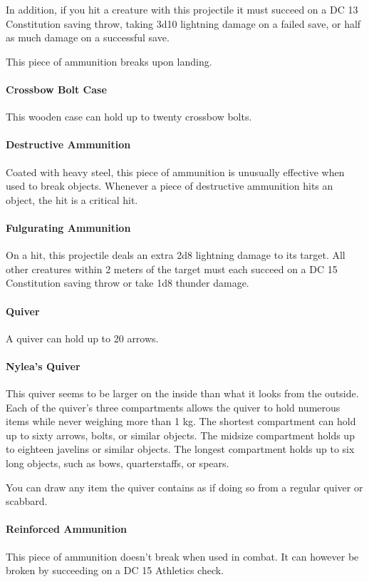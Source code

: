     In addition, if you hit a creature with this projectile it must succeed on a DC 13 Constitution saving throw, taking 3d10 lightning damage on a failed save, or half as much damage on a successful save.

    This piece of ammunition breaks upon landing.
\paragraph{Crossbow Bolt Case}
    This wooden case can hold up to twenty crossbow bolts.
\paragraph{Destructive Ammunition}
    Coated with heavy steel, this piece of ammunition is unusually effective when used to break objects.
    Whenever a piece of destructive ammunition hits an object, the hit is a critical hit.
\paragraph{Fulgurating Ammunition}
    On a hit, this projectile deals an extra 2d8 lightning damage to its target.
    All other creatures within 2 meters of the target must each succeed on a DC 15 Constitution saving throw or take 1d8 thunder damage.
\paragraph{Quiver}
    A quiver can hold up to 20 arrows.
\paragraph{Nylea's Quiver}
    This quiver seems to be larger on the inside than what it looks from the outside.
    Each of the quiver's three compartments allows the quiver to hold numerous items while never weighing more than 1 kg.
    The shortest compartment can hold up to sixty arrows, bolts, or similar objects.
    The midsize compartment holds up to eighteen javelins or similar objects.
    The longest compartment holds up to six long objects, such as bows, quarterstaffs, or spears.

    You can draw any item the quiver contains as if doing so from a regular quiver or scabbard.
\paragraph{Reinforced Ammunition}
    This piece of ammunition doesn't break when used in combat.
    It can however be broken by succeeding on a DC 15 Athletics check.
